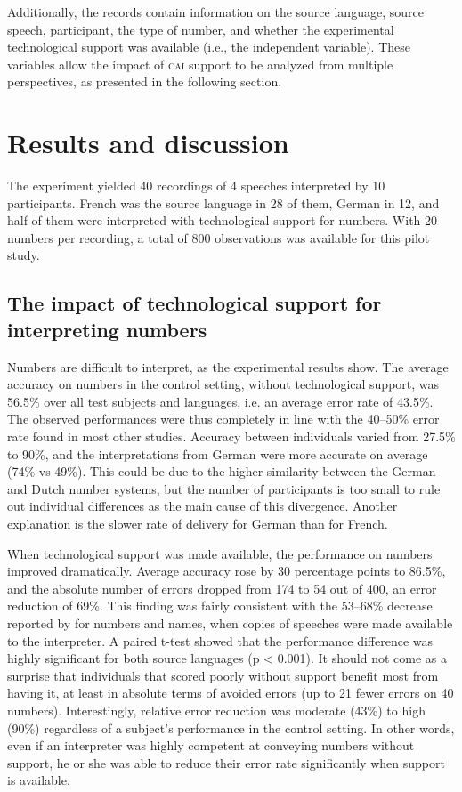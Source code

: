 \documentclass[output=paper]{langsci/langscibook}
\begin{document}
Additionally, the records contain information on the source language, source speech, participant, the type of number, and whether the experimental technological support was available (i.e., the independent variable). These variables allow the impact of \textsc{cai} support to be analyzed from multiple perspectives, as presented in the following section.

\section{Results and discussion}\largerpage
The experiment yielded 40 recordings of 4 speeches interpreted by 10 participants. French was the source language in 28 of them, German in 12, and half of them were interpreted with technological support for numbers. With 20 numbers per recording, a total of 800 observations was available for this pilot study.

\subsection{The impact of technological support for interpreting numbers}
Numbers are difficult to interpret, as the experimental results show. The average accuracy on numbers in the control setting, without technological support, was 56.5\% over all test subjects and languages, i.e. an average error rate of 43.5\%. The observed performances were thus completely in line with the 40--50\% error rate found in most other studies. Accuracy between individuals varied from 27.5\% to 90\%, and the interpretations from German were more accurate on average (74\% vs 49\%). This could be due to the higher similarity between the German and Dutch number systems, but the number of participants is too small to rule out individual differences as the main cause of this divergence. Another explanation is the slower rate of delivery for German than for French.

When technological support was made available, the performance on numbers improved dramatically. Average accuracy rose by 30 percentage points to 86.5\%, and the absolute number of errors dropped from 174 to 54 out of 400, an error reduction of 69\%. This finding was fairly consistent with the 53--68\% decrease reported by \citet{Lamberger-Felber2001} for numbers and names, when copies of speeches were made available to the interpreter. A paired t-test showed that the performance difference was highly significant for both source languages (p < 0.001). It should not come as a surprise that individuals that scored poorly without support benefit most from having it, at least in absolute terms of avoided errors (up to 21 fewer errors on 40 numbers). Interestingly, relative error reduction was moderate (43\%) to high (90\%) regardless of a subject’s performance in the control setting. In other words, even if an interpreter was highly competent at conveying numbers without support, he or she was able to reduce their error rate significantly when support is available.
\end{document}
